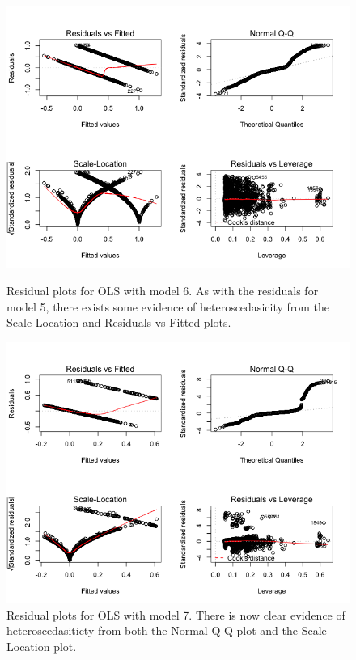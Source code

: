 \documentclass{article}
\begin{document}
 \begin{figure}
\centering
\includegraphics[scale=0.5]{model6Resid}
\label{model6resid}
\caption{Residual plots for OLS with model 6. As with the residuals for model 5, there exists some evidence of heteroscedasicity from the Scale-Location and Residuals vs Fitted plots.}
\end{figure}

 \begin{figure}
\centering
\includegraphics[scale=0.5]{model7Resid}

\caption{Residual plots for OLS with model 7. There is now clear evidence of heteroscedasiticty from both the Normal Q-Q plot and the Scale-Location plot.}
\label{model7resid}
\end{figure}
\end{document}

